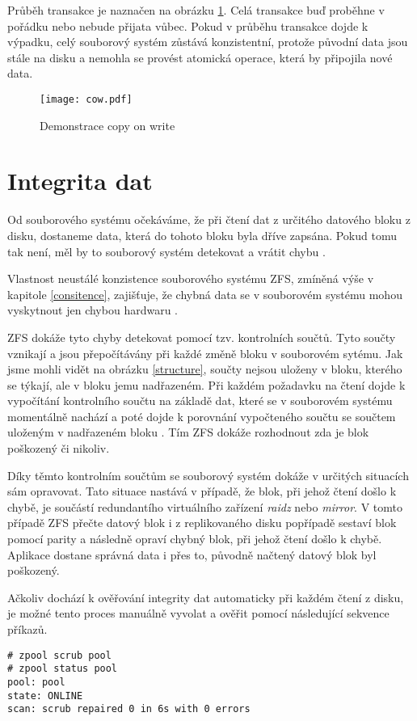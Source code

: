 Průběh transakce je naznačen na obrázku \ref{cow}. Celá transakce buď proběhne v pořádku nebo nebude přijata vůbec. Pokud v průběhu transakce dojde k výpadku, celý souborový systém zůstává konzistentní, protože původní data jsou stále na disku a nemohla se provést atomická operace, která by připojila nové data.
\begin{figure}[h]
    \caption{Demonstrace copy on write}
    \label{cow}
    \texttt{[image: cow.pdf]}
\end{figure}
\section{Integrita dat}
\label{checksum}
Od souborového systému očekáváme, že při čtení dat z určitého datového bloku z disku, dostaneme data, která do tohoto bloku byla dříve zapsána. Pokud tomu tak není, měl by to souborový systém detekovat a vrátit chybu \cite{integrity1}.

Vlastnost neustálé konzistence souborového systému ZFS, zmíněná výše v kapitole \ref{consitence}, zajišťuje, že chybná data se v souborovém systému mohou vyskytnout jen chybou hardwaru \cite{integrity2}.

ZFS dokáže tyto chyby detekovat pomocí tzv. kontrolních součtů. Tyto součty vznikají a jsou přepočítávány při každé změně bloku v souborovém sytému. Jak jsme mohli vidět na obrázku \ref{structure}, součty nejsou uloženy v bloku, kterého se týkají, ale v bloku jemu nadřazeném. Při každém požadavku na čtení dojde k vypočítání kontrolního součtu na základě dat, které se v souborovém systému momentálně nachází a poté dojde k porovnání vypočteného součtu se součtem uloženým v nadřazeném bloku \cite{integrity1}. Tím ZFS dokáže rozhodnout zda je blok poškozený či nikoliv.

Díky těmto kontrolním součtům se souborový systém dokáže v určitých situacích sám opravovat. Tato situace nastává v případě, že blok, při jehož čtení došlo k chybě, je součástí redundantího virtuálního zařízení \emph{raidz} nebo \emph{mirror}. V tomto případě ZFS přečte datový blok i z replikovaného disku popřípadě sestaví blok pomocí parity a následně opraví chybný blok, při jehož čtení došlo k chybě. Aplikace dostane správná data i přes to, původně načtený datový blok byl poškozený.

Ačkoliv dochází k ověřování integrity dat automaticky při každém čtení z disku, je možné tento proces manuálně vyvolat a ověřit pomocí následující sekvence příkazů.
\begin{verbatim}
# zpool scrub pool
# zpool status pool
pool: pool
state: ONLINE
scan: scrub repaired 0 in 6s with 0 errors
\end{verbatim}

